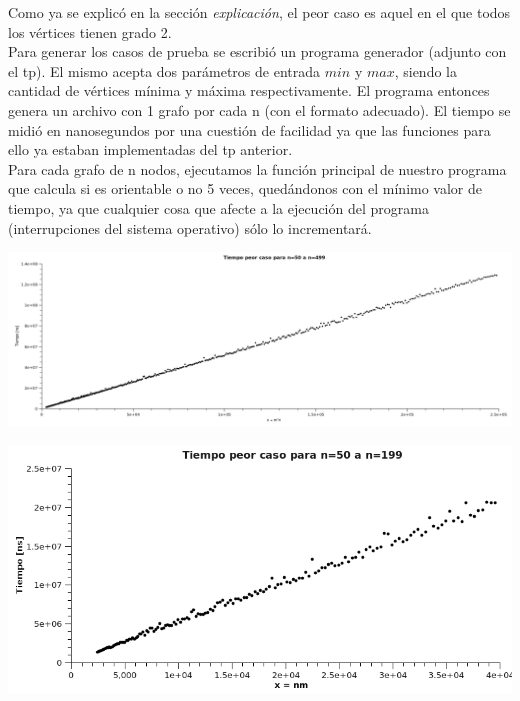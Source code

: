 Como ya se explicó en la sección \textit{explicación}, el peor caso es aquel en el que todos los vértices tienen grado 2.\\
Para generar los casos de prueba se escribió un programa generador (adjunto con el tp). El mismo acepta dos parámetros de entrada $min$ y $max$, siendo la cantidad de vértices mínima y 
máxima respectivamente. El programa entonces genera un archivo con 1 grafo por cada n (con el formato adecuado). El tiempo se midió en nanosegundos por una cuestión de facilidad ya que 
las funciones para ello ya estaban implementadas del tp anterior.\\
Para cada grafo de n nodos, ejecutamos la función principal de nuestro programa que calcula si es orientable o no 5 veces, quedándonos con el mínimo valor de tiempo, ya que cualquier 
cosa que afecte a la ejecución del programa (interrupciones del sistema operativo) sólo lo incrementará.\\

\begin{center}
\includegraphics[scale=0.6]{img/ej2/tiempos1.png} 
\end{center}
\begin{center}
 \includegraphics[scale=0.6]{img/ej2/tiempos2.png}
\end{center}
